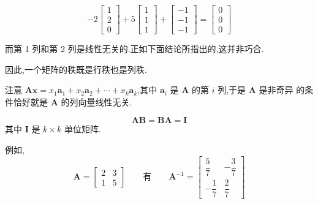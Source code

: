 
\[
-2\begin{bmatrix} 1 \\ 2 \\ 0 \end{bmatrix} + 5\begin{bmatrix} 1 \\ 1 \\ 1 \end{bmatrix} + \begin{bmatrix} -1 \\ -1 \\ -1 \end{bmatrix} = \begin{bmatrix} 0 \\ 0 \\ 0 \end{bmatrix}
\]

而第 1 列和第 2 列是线性无关的.正如下面结论所指出的,这并非巧合.


因此,一个矩阵的秩既是行秩也是列秩.


注意 $\bm{A}\bm{x} = x_1\bm{a}_1 + x_2\bm{a}_2 + \cdots + x_k\bm{a}_k$,其中 $\bm{a}_i$ 是 $\bm{A}$ 的第 $i$ 列,于是 $\bm{A}$ 是非奇异 的条件恰好就是 $\bm{A}$ 的列向量线性无关.

\[
\bm{A}\bm{B} = \bm{B}\bm{A} = \bm{I}
\]
其中 $\bm{I}$ 是 $k\times k$ 单位矩阵.


例如,
\[
\bm{A} = \begin{bmatrix} 2 & 3 \\ 1 & 5 \end{bmatrix} \qquad \text{有} \qquad
\bm{A}^{-1} = \begin{bmatrix} \dfrac{5}{7} & -\dfrac{3}{7} \\[8pt] -\dfrac{1}{7} & \dfrac{2}{7} \end{bmatrix}
\]

